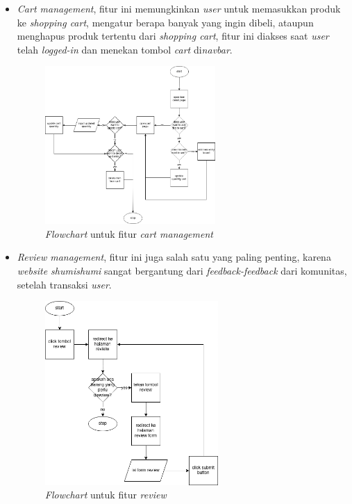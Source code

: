 \documentclass[a4paper]{article}
\begin{document}
\begin{enumerate}[label=\alph*. ]
\begin{itemize}
            \item \textit{Cart management}, fitur ini memungkinkan \textit{user} untuk memasukkan produk ke \textit{shopping cart}, mengatur berapa banyak yang ingin dibeli, ataupun menghapus produk tertentu dari \textit{shopping cart}, fitur ini diakses saat \textit{user} telah \textit{logged-in} dan menekan tombol \textit{cart} di\textit{navbar}.
            \begin{figure}[h]
                \centering
                \includegraphics*[height=6cm]{./diagram/flowchart/chart/Cart management.png}
                \caption{\textit{Flowchart} untuk fitur \textit{cart management}}
            \end{figure}

            \item \textit{Review management}, fitur ini juga salah satu yang paling penting, karena \textit{website shumishumi} sangat bergantung dari \textit{feedback-feedback} dari komunitas, setelah transaksi \textit{user}.
            \begin{figure}[h]
                \centering
                \includegraphics*[height=7cm]{./diagram/flowchart/chart/manage and view review.png}
                \caption{\textit{Flowchart} untuk fitur \textit{review}}
            \end{figure}


\end{itemize}
\end{enumerate}
\end{document}
